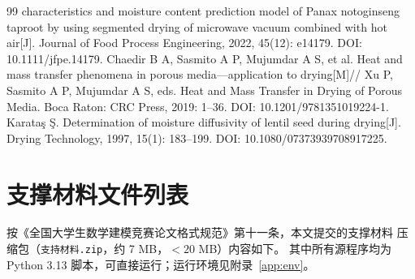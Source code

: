 \begin{thebibliography}{99}
  characteristics and moisture content prediction model of Panax notoginseng
  taproot by using segmented drying of microwave vacuum combined with hot
  air[J]. Journal of Food Process Engineering, 2022, 45(12): e14179.
  DOI: 10.1111/jfpe.14179.
 Chaedir B A, Sasmito A P, Mujumdar A S, et al.
  Heat and mass transfer phenomena in porous media---application to drying[M]//
  Xu P, Sasmito A P, Mujumdar A S, eds. Heat and Mass Transfer in Drying of
  Porous Media. Boca Raton: CRC Press, 2019: 1--36.
  DOI: 10.1201/9781351019224-1.
 Karata\c{s} \c{S}. Determination of moisture diffusivity
  of lentil seed during drying[J]. Drying Technology, 1997, 15(1): 183--199.
  DOI: 10.1080/07373939708917225.
\end{thebibliography}

\appendix
\section{支撑材料文件列表}

按《全国大学生数学建模竞赛论文格式规范》第十一条，本文提交的支撑材料
压缩包（\texttt{支持材料.zip}，约 7 MB，$<20$ MB）内容如下。
其中所有源程序均为 Python 3.13 脚本，可直接运行；运行环境见附录~\ref{app:env}。

